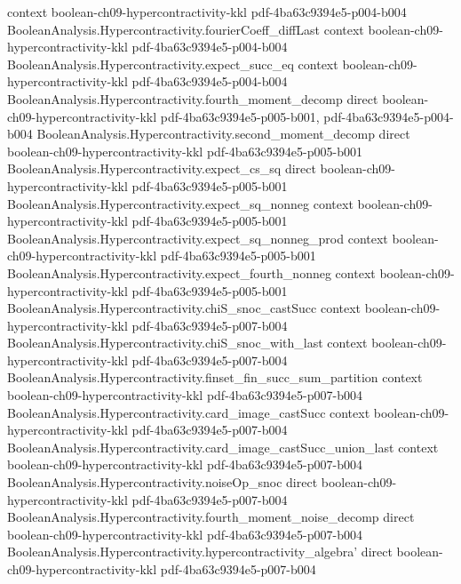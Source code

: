 \begin{theorem}
  {context}
  {boolean-ch09-hypercontractivity-kkl}
  {pdf-4ba63c9394e5-p004-b004}
\proofstep
  {BooleanAnalysis.Hypercontractivity.fourierCoeff_diffLast}
  {context}
  {boolean-ch09-hypercontractivity-kkl}
  {pdf-4ba63c9394e5-p004-b004}
\proofstep
  {BooleanAnalysis.Hypercontractivity.expect_succ_eq}
  {context}
  {boolean-ch09-hypercontractivity-kkl}
  {pdf-4ba63c9394e5-p004-b004}
\proofstep
  {BooleanAnalysis.Hypercontractivity.fourth_moment_decomp}
  {direct}
  {boolean-ch09-hypercontractivity-kkl}
  {pdf-4ba63c9394e5-p005-b001,
    pdf-4ba63c9394e5-p004-b004}
\proofstep
  {BooleanAnalysis.Hypercontractivity.second_moment_decomp}
  {direct}
  {boolean-ch09-hypercontractivity-kkl}
  {pdf-4ba63c9394e5-p005-b001}
\proofstep
  {BooleanAnalysis.Hypercontractivity.expect_cs_sq}
  {direct}
  {boolean-ch09-hypercontractivity-kkl}
  {pdf-4ba63c9394e5-p005-b001}
\proofstep
  {BooleanAnalysis.Hypercontractivity.expect_sq_nonneg}
  {context}
  {boolean-ch09-hypercontractivity-kkl}
  {pdf-4ba63c9394e5-p005-b001}
\proofstep
  {BooleanAnalysis.Hypercontractivity.expect_sq_nonneg_prod}
  {context}
  {boolean-ch09-hypercontractivity-kkl}
  {pdf-4ba63c9394e5-p005-b001}
\proofstep
  {BooleanAnalysis.Hypercontractivity.expect_fourth_nonneg}
  {context}
  {boolean-ch09-hypercontractivity-kkl}
  {pdf-4ba63c9394e5-p005-b001}
\proofstep
  {BooleanAnalysis.Hypercontractivity.chiS_snoc_castSucc}
  {context}
  {boolean-ch09-hypercontractivity-kkl}
  {pdf-4ba63c9394e5-p007-b004}
\proofstep
  {BooleanAnalysis.Hypercontractivity.chiS_snoc_with_last}
  {context}
  {boolean-ch09-hypercontractivity-kkl}
  {pdf-4ba63c9394e5-p007-b004}
\proofstep
  {BooleanAnalysis.Hypercontractivity.finset_fin_succ_sum_partition}
  {context}
  {boolean-ch09-hypercontractivity-kkl}
  {pdf-4ba63c9394e5-p007-b004}
\proofstep
  {BooleanAnalysis.Hypercontractivity.card_image_castSucc}
  {context}
  {boolean-ch09-hypercontractivity-kkl}
  {pdf-4ba63c9394e5-p007-b004}
\proofstep
  {BooleanAnalysis.Hypercontractivity.card_image_castSucc_union_last}
  {context}
  {boolean-ch09-hypercontractivity-kkl}
  {pdf-4ba63c9394e5-p007-b004}
\proofstep
  {BooleanAnalysis.Hypercontractivity.noiseOp_snoc}
  {direct}
  {boolean-ch09-hypercontractivity-kkl}
  {pdf-4ba63c9394e5-p007-b004}
\proofstep
  {BooleanAnalysis.Hypercontractivity.fourth_moment_noise_decomp}
  {direct}
  {boolean-ch09-hypercontractivity-kkl}
  {pdf-4ba63c9394e5-p007-b004}
\proofstep
  {BooleanAnalysis.Hypercontractivity.hypercontractivity_algebra'}
  {direct}
  {boolean-ch09-hypercontractivity-kkl}
  {pdf-4ba63c9394e5-p007-b004}

\end{theorem}

